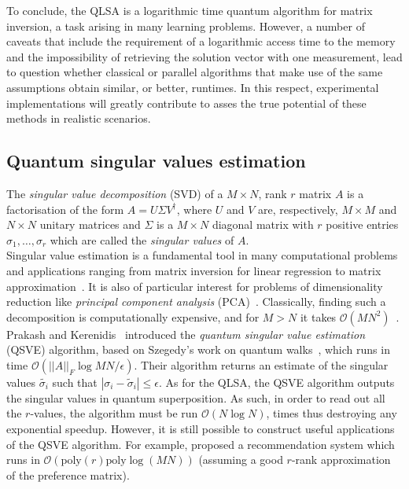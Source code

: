\documentclass[a4paper, 11pt]{article}
\newcommand{\Ord}[1]{\mathcal{O}(#1)}
\begin{document}
To conclude, the QLSA is a logarithmic time quantum algorithm for matrix inversion, a task arising in many learning problems. However, a number of caveats that include the requirement of a logarithmic access time to the memory and the impossibility of retrieving the solution vector with one measurement, lead to question whether classical or parallel algorithms that make use of the same assumptions obtain similar, or better, runtimes. In this respect, experimental implementations will greatly contribute to asses the true potential of these methods in realistic scenarios.

\subsection*{Quantum singular values estimation}

The \textit{singular value decomposition} (SVD) of a $M \times N$, rank $r$ matrix $A$ is a factorisation of the form 
$A = U \Sigma V^{\dagger}$, where $U$ and $V$ are, respectively, $M \times M$ and $N \times N$ unitary matrices and $\Sigma$ is a $M \times N$ diagonal matrix 
with $r$ positive entries $\sigma_1 , \ldots, \sigma_r$ which are called the \textit{singular values} of $A$.\\ 

Singular value estimation is a fundamental tool in many computational problems and applications ranging from matrix inversion for linear regression to matrix approximation~\cite{golub2012matrix}. It is also of particular interest for problems of dimensionality reduction like \textit{principal component analysis} (PCA)~\cite{jolliffe1986principal}. Classically, finding such a decomposition is computationally expensive, and for $M > N$ it takes $\Ord{M N^2}$~\cite{trefethen1997numerical}.\\ 

Prakash and Kerenidis~\cite{prakash2014quantum, kerenidis2017quantum} introduced the \textit{quantum singular value estimation} (QSVE) algorithm, based on Szegedy's work on quantum walks~\cite{szegedy2004quantum}, which runs in time $\Ord{ ||A||_F \log{MN}/\epsilon }$. Their algorithm returns an estimate of the singular values $\tilde{\sigma_i}$ such that $| \sigma_i - \tilde{\sigma}_i| \leq \epsilon$. As for the QLSA, the QSVE algorithm outputs the singular values  in quantum superposition. As such, in order to read out all the $r$-values, the algorithm must be run $\Ord{N\log N}$, times thus destroying any exponential speedup. However, it is still possible to construct useful applications of the QSVE algorithm. For example, \cite{kerenidis2017quantum} proposed a recommendation system which runs in
$\Ord{\text{poly}(r)\text{poly}\log(MN)}$ (assuming a good $r$-rank approximation of the preference matrix). \\
\end{document}
